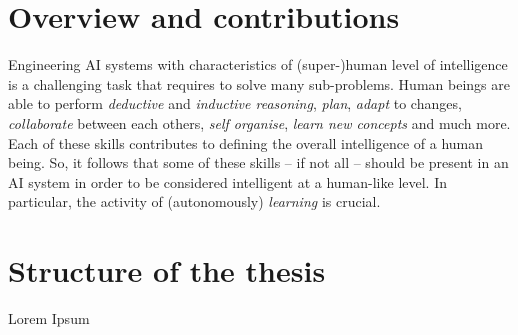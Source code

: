 \begin{refsection}
\section{Overview and contributions}
\label{sec:overview-and-contributions}
%
Engineering \ac{AI} systems with characteristics of (super-)human level of intelligence is a challenging task that requires to solve many sub-problems.
%
Human beings are able to perform \emph{deductive} and \emph{inductive reasoning}, \emph{plan}, \emph{adapt} to changes, \emph{collaborate} between each others, \emph{self organise}, \emph{learn new concepts} and much more.
%
Each of these skills contributes to defining the overall intelligence of a human being.
%
So, it follows that some of these skills -- if not all -- should be present in an \ac{AI} system in order to be considered intelligent at a human-like level.
%
In particular, the activity of (autonomously) \emph{learning} is crucial.
%

\section{Structure of the thesis}
\label{sec:structure-of-the-thesis}
%
Lorem Ipsum

\printbibliography[title=Reference,heading=bibintoc]

\end{refsection}